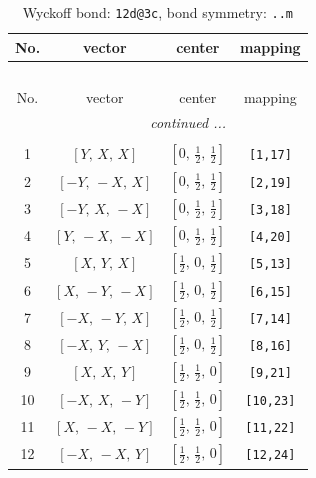 \documentclass[fleqn,8pt]{jsarticle}
\begin{document}
\begin{longtable}{cccc}
\caption{Wyckoff bond: {\tt 12d@3c}, bond symmetry: {\tt ..m}}
 \\
 \hline \hline
No. & vector & center & mapping \\ \hline \endfirsthead

\multicolumn{3}{l}{\tablename\ \thetable{}} \\
 \hline \hline
No. & vector & center & mapping \\ \hline \endhead

 \hline \hline
\multicolumn{3}{r}{\footnotesize\it continued ...} \\ \endfoot

 \hline \hline
\multicolumn{3}{r}{} \\ \endlastfoot

1 & $\left[ Y,\, X,\, X \right]$ & $\left[ 0,\, \frac{1}{2},\, \frac{1}{2} \right]$ & {\tt [1,17]} \\ \hline
2 & $\left[ - Y,\, - X,\, X \right]$ & $\left[ 0,\, \frac{1}{2},\, \frac{1}{2} \right]$ & {\tt [2,19]} \\ \hline
3 & $\left[ - Y,\, X,\, - X \right]$ & $\left[ 0,\, \frac{1}{2},\, \frac{1}{2} \right]$ & {\tt [3,18]} \\ \hline
4 & $\left[ Y,\, - X,\, - X \right]$ & $\left[ 0,\, \frac{1}{2},\, \frac{1}{2} \right]$ & {\tt [4,20]} \\ \hline
5 & $\left[ X,\, Y,\, X \right]$ & $\left[ \frac{1}{2},\, 0,\, \frac{1}{2} \right]$ & {\tt [5,13]} \\ \hline
6 & $\left[ X,\, - Y,\, - X \right]$ & $\left[ \frac{1}{2},\, 0,\, \frac{1}{2} \right]$ & {\tt [6,15]} \\ \hline
7 & $\left[ - X,\, - Y,\, X \right]$ & $\left[ \frac{1}{2},\, 0,\, \frac{1}{2} \right]$ & {\tt [7,14]} \\ \hline
8 & $\left[ - X,\, Y,\, - X \right]$ & $\left[ \frac{1}{2},\, 0,\, \frac{1}{2} \right]$ & {\tt [8,16]} \\ \hline
9 & $\left[ X,\, X,\, Y \right]$ & $\left[ \frac{1}{2},\, \frac{1}{2},\, 0 \right]$ & {\tt [9,21]} \\ \hline
10 & $\left[ - X,\, X,\, - Y \right]$ & $\left[ \frac{1}{2},\, \frac{1}{2},\, 0 \right]$ & {\tt [10,23]} \\ \hline
11 & $\left[ X,\, - X,\, - Y \right]$ & $\left[ \frac{1}{2},\, \frac{1}{2},\, 0 \right]$ & {\tt [11,22]} \\ \hline
12 & $\left[ - X,\, - X,\, Y \right]$ & $\left[ \frac{1}{2},\, \frac{1}{2},\, 0 \right]$ & {\tt [12,24]} \\
\end{longtable}
\end{document}
